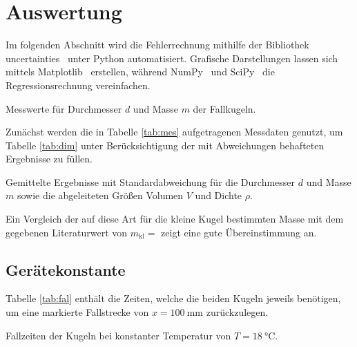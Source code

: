\section{Auswertung}
\label{sec:auswertung}

Im folgenden Abschnitt wird die Fehlerrechnung mithilfe der Bibliothek uncertainties~\cite{uncertainties} unter Python
\cite{python} automatisiert. Grafische Darstellungen lassen sich mittels Matplotlib~\cite{matplotlib} erstellen, während
NumPy~\cite{numpy} und SciPy~\cite{scipy} die Regressionsrechnung vereinfachen.

\begin{table}
	\centering
	\caption{Messwerte für Durchmesser $d$ und Masse $m$ der Fallkugeln.}
	
	\label{tab:mes}
\end{table}

Zunächst werden die in Tabelle \ref{tab:mes} aufgetragenen Messdaten genutzt, um Tabelle \ref{tab:dim} unter Berücksichtigung
der mit Abweichungen behafteten Ergebnisse zu füllen.

\begin{table}
	\centering
	\caption{Gemittelte Ergebnisse mit Standardabweichung für die Durchmesser $d$ und
			 Masse $m$ sowie die abgeleiteten Größen Volumen $V$ und Dichte $\rho$.}
	
	\label{tab:dim}
\end{table}

Ein Vergleich der auf diese Art für die kleine Kugel bestimmten Masse mit dem gegebenen Literaturwert von
$m_\text{kl} = $ \cite{viskos} zeigt eine gute Übereinstimmung an.

\subsection{Gerätekonstante}

Tabelle \ref{tab:fal} enthält die Zeiten, welche die beiden Kugeln jeweils benötigen, um eine markierte Fallstrecke
von $x = \qty{100}{\milli\meter}$ zurückzulegen.

\begin{table}
	\centering
	\caption{Fallzeiten der Kugeln bei konstanter Temperatur von $T = \qty{18}{\celsius}$.}
	
	\label{tab:fal}
\end{table}

